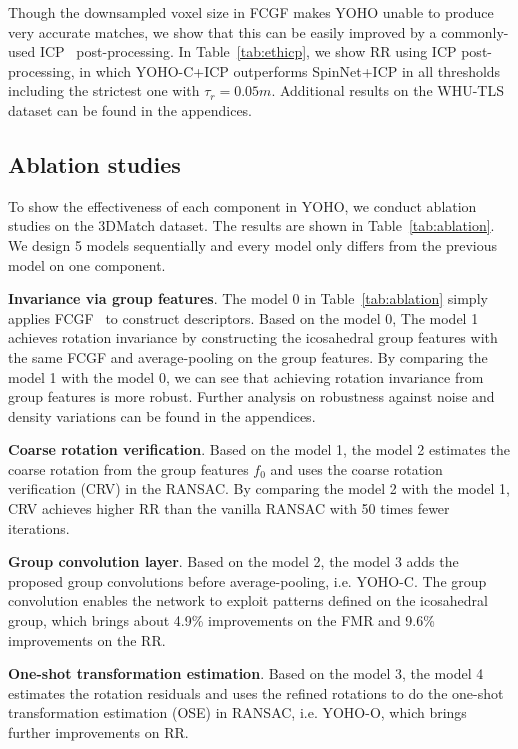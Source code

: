 Though the downsampled voxel size in FCGF makes YOHO unable to produce very accurate matches, we show that this can be easily improved by a commonly-used ICP~\cite{icp} post-processing. In Table~\ref{tab:ethicp}, we show RR using ICP post-processing, in which YOHO-C+ICP outperforms SpinNet+ICP in all thresholds including the strictest one with $\tau_r=0.05m$. Additional results on the WHU-TLS dataset can be found in the appendices.


\subsection{Ablation studies}
\label{sec:ablation}
To show the effectiveness of each component in YOHO, we conduct ablation studies on the 3DMatch dataset. The results are shown in Table~\ref{tab:ablation}. We design 5 models sequentially and every model only differs from the previous model on one component. 


\textbf{Invariance via group features}. The model 0 in Table~\ref{tab:ablation} simply applies FCGF~\cite{FCGF} to construct descriptors. Based on the model 0, The model 1 achieves rotation invariance by constructing the icosahedral group features with the same FCGF and average-pooling on the group features. By comparing the model 1 with the model 0, we can see that achieving rotation invariance from group features is more robust. Further analysis on robustness against noise and density variations can be found in the appendices.

\textbf{Coarse rotation verification}. Based on the model 1, the model 2 estimates the coarse rotation from the group features $f_0$ and uses the coarse rotation verification (CRV) in the RANSAC. By comparing the model 2 with the model 1, CRV achieves higher RR than the vanilla RANSAC with 50 times fewer iterations.

\textbf{Group convolution layer}. Based on the model 2, the model 3 adds the proposed group convolutions before average-pooling, i.e. YOHO-C. The group convolution enables the network to exploit patterns defined on the icosahedral group, which brings about 4.9\% improvements on the FMR and 9.6\% improvements on the RR.

\textbf{One-shot transformation estimation}. Based on the model 3, the model 4 estimates the rotation residuals and uses the refined rotations to do the one-shot transformation estimation (OSE) in RANSAC, i.e. YOHO-O, which brings further improvements on RR.



